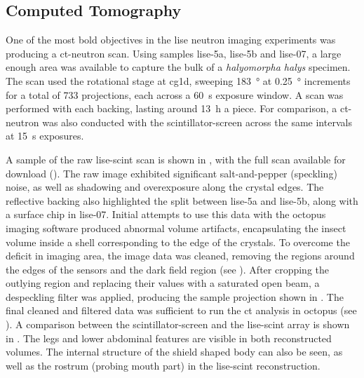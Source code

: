 \documentclass[../../../main.tex]{subfiles}%
\begin{document}
%
    \subsection{Computed Tomography}%
    \label{sec:chapter-4:scintillator-array:computed-tomography}%
    One of the most bold objectives in the \gls{lise} neutron imaging experiments was producing a \gls{ct-neutron} scan.
    Using samples \gls{lise-5a}, \gls{lise-5b} and \gls{lise-07}, a large enough area was available to capture the bulk of a \textit{halyomorpha halys} specimen.
    The scan used the rotational stage at \gls{cg1d}, sweeping \SI{183}{\degree} at \SI{0.25}{\degree} increments for a total of \num{733} projections, each across a \SI{60}{\second} exposure window.
    A scan was performed with each backing, lasting around \SI{13}{\hour} a piece.
    For comparison, a \gls{ct-neutron} was also conducted with the \gls{scintillator-screen} across the same intervals at \SI{15}{\second} exposures.
    \par%
    A sample of the raw \gls{lise-scint} scan is shown in , with the full scan available for download ().
    The raw image exhibited significant salt-and-pepper (speckling) noise, as well as shadowing and overexposure along the crystal edges.
    The reflective backing also highlighted the split between \gls{lise-5a} and \gls{lise-5b}, along with a surface chip in \gls{lise-07}.
    Initial attempts to use this data with the \gls{octopus} imaging software produced abnormal volume artifacts, encapsulating the insect volume inside a shell corresponding to the edge of the crystals.
    To overcome the deficit in imaging area, the image data was cleaned, removing the regions around the edges of the sensors and the dark field region (see ).
    After cropping the outlying region and replacing their values with a saturated open beam, a despeckling filter was applied, producing the sample projection shown in .
    The final cleaned and filtered data was sufficient to run the \gls{ct} analysis in \gls{octopus} (see ).
    A comparison between the \gls{scintillator-screen} and the \gls{lise-scint} array is shown in .
    The legs and lower abdominal features are visible in both reconstructed volumes.
    The internal structure of the shield shaped body can also be seen, as well as the rostrum (probing mouth part) in the \gls{lise-scint} reconstruction.
\end{document}
